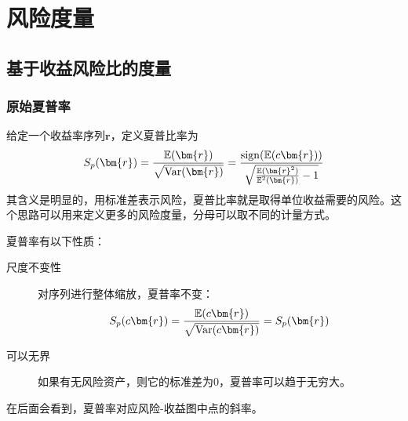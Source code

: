 \section{风险度量}
\subsection{基于收益风险比的度量}
\subsubsection{原始夏普率}
\begin{definition}
给定一个收益率序列$\bm{r}$，定义夏普比率为
$$S_p(\bm{r})=\frac{\E(\bm{r})}{\sqrt{\Var(\bm{r})}}=\frac{\sign(\E(c\bm{r}))}{\sqrt{\frac{\E(\bm{r}^2)}{\E^2(\bm{r})}-1}}$$
其含义是明显的，用标准差表示风险，夏普比率就是取得单位收益需要的风险。这个思路可以用来定义更多的风险度量，分母可以取不同的计量方式。
\end{definition}

\begin{property}
夏普率有以下性质：
\begin{description}
\item[尺度不变性] 对序列进行整体缩放，夏普率不变：
$$S_p(c\bm{r})=\frac{\E(c\bm{r})}{\sqrt{\Var(c\bm{r})}}=S_p(\bm{r})$$
\item[可以无界] 如果有无风险资产，则它的标准差为0，夏普率可以趋于无穷大。
\end{description}
\end{property}
在后面会看到，夏普率对应风险-收益图中点的斜率。

